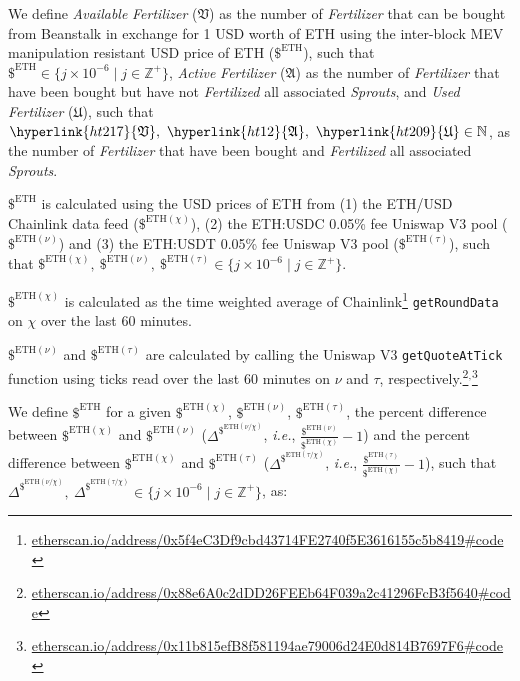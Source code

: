\documentclass[tikz]{article}
\newcommand{\code}[1]{\texttt{#1}}
\newcommand{\term}[1]{\textsl{#1}}
\newcommand{\fref}[1]{\footnote{\href{http://#1}{#1}}}
\begin{document}
\newpage

We define \term{Available} \term{Fertilizer} (\hyperlink{ht217}{$\mathfrak{V}$}) as the number of \term{Fertilizer} that can be bought from Beanstalk in exchange for 1 USD worth of ETH using the inter-block MEV manipulation resistant USD price of ETH ($\$^{\text{ETH}}$), such that $\$^{\text{ETH}} \in \{j \times 10^{-6} \mid j \in \mathbb{Z}^{+} \}$, \term{Active} \term{Fertilizer} (\hyperlink{ht12}{$\mathfrak{A}$}) as the number of \term{Fertilizer} that have been bought but have not \term{Fertilized} all associated \term{Sprouts}, and \term{Used} \term{Fertilizer} (\hyperlink{ht209}{$\mathfrak{U}$}), such that $\hyperlink{ht217}{\mathfrak{V}},\ \hyperlink{ht12}{\mathfrak{A}},\ \hyperlink{ht209}{\mathfrak{U}} \in \mathbb{N}$, as the number of \term{Fertilizer} that have been bought and \term{Fertilized} all associated \term{Sprouts}. 

$\$^{\text{ETH}}$ is calculated using the USD prices of ETH from (1) the ETH/USD Chainlink data feed ($\$^{\text{ETH}(\chi)}$), (2) the ETH:USDC 0.05\% fee Uniswap V3 pool  ($\$^{\text{ETH}(\nu)}$) and (3) the ETH:USDT 0.05\% fee Uniswap V3 pool ($\$^{\text{ETH}(\tau)}$), such that $\$^{\text{ETH}(\chi)},\ \$^{\text{ETH}(\nu)},\ \$^{\text{ETH}(\tau)} \in \{j \times 10^{-6} \mid j \in \mathbb{Z}^{+} \}$.

$\$^{\text{ETH}(\chi)}$ is calculated as the time weighted average of Chainlink\fref{etherscan.io/address/0x5f4eC3Df9cbd43714FE2740f5E3616155c5b8419\#code} \code{getRoundData} on $\chi$ over the last 60 minutes.

$\$^{\text{ETH}(\nu)}$ and $\$^{\text{ETH}(\tau)}$ are calculated by calling the Uniswap V3 \code{getQuoteAtTick} function using ticks read over the last 60 minutes on $\nu$ and $\tau$, respectively.\fref{etherscan.io/address/0x88e6A0c2dDD26FEEb64F039a2c41296FcB3f5640\#code}$^{,}$\fref{etherscan.io/address/0x11b815efB8f581194ae79006d24E0d814B7697F6\#code}

We define $\$^{\text{ETH}}$ for a given $\$^{\text{ETH}(\chi)}$, $\$^{\text{ETH}(\nu)}$, $\$^{\text{ETH}(\tau)}$, the percent difference between $\$^{\text{ETH}(\chi)}$ and $\$^{\text{ETH}(\nu)}$ ($\Delta^{\$^{\text{ETH}(\nu \slash \chi)}}$, \term{i.e.}, $\frac{\$^{\text{ETH}(\nu)}}{\$^{\text{ETH}(\chi)}} - 1$) and the percent difference between $\$^{\text{ETH}(\chi)}$ and $\$^{\text{ETH}(\tau)}$ ($\Delta^{\$^{\text{ETH}(\tau \slash \chi)}}$, \term{i.e.}, $\frac{\$^{\text{ETH}(\tau)}}{\$^{\text{ETH}(\chi)}} - 1$), such that $\Delta^{\$^{\text{ETH}(\nu \slash \chi)}},\ \Delta^{\$^{\text{ETH}(\tau \slash \chi)}} \in \{j \times 10^{-6} \mid j \in \mathbb{Z}^{+} \}$, as:
\end{document}
